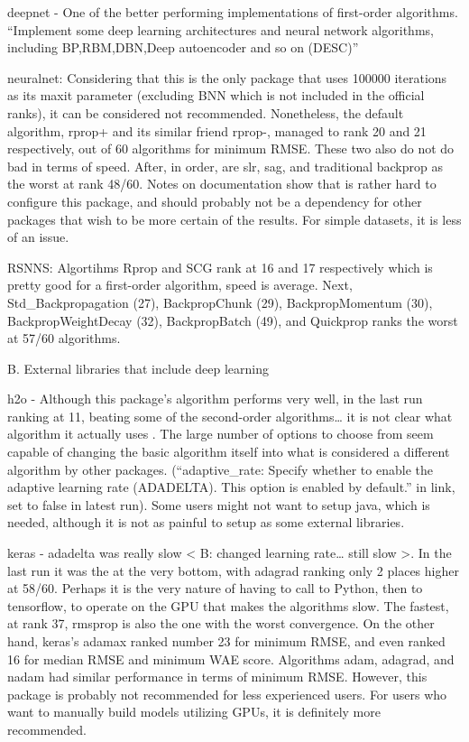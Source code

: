 deepnet - One of the better performing implementations of first-order
algorithms. ``Implement some deep learning architectures and neural
network algorithms, including BP,RBM,DBN,Deep autoencoder and so on
(DESC)''

neuralnet: Considering that this is the only package that uses 100000
iterations as its maxit parameter (excluding BNN which is not included
in the official ranks), it can be considered not recommended.
Nonetheless, the default algorithm, rprop+ and its similar friend
rprop-, managed to rank 20 and 21 respectively, out of 60 algorithms for
minimum RMSE. These two also do not do bad in terms of speed. After, in
order, are slr, sag, and traditional backprop as the worst at rank
48/60. Notes on documentation show that is rather hard to configure this
package, and should probably not be a dependency for other packages that
wish to be more certain of the results. For simple datasets, it is less
of an issue.

RSNNS: Algortihms Rprop and SCG rank at 16 and 17 respectively which is
pretty good for a first-order algorithm, speed is average. Next,
Std\_Backpropagation (27), BackpropChunk (29), BackpropMomentum (30),
BackpropWeightDecay (32), BackpropBatch (49), and Quickprop ranks the
worst at 57/60 algorithms.

B. External libraries that include deep learning

h2o - Although this package's algorithm performs very well, in the last
run ranking at 11, beating some of the second-order algorithms\ldots{}
it is not clear what algorithm it actually uses . The large number of
options to choose from seem capable of changing the basic algorithm
itself into what is considered a different algorithm by other packages.
(``adaptive\_rate: Specify whether to enable the adaptive learning rate
(ADADELTA). This option is enabled by default.'' in link, set to false
in latest run). Some users might not want to setup java, which is
needed, although it is not as painful to setup as some external
libraries.

keras - adadelta was really slow \textless{} B: changed learning
rate\ldots{} still slow \textgreater. In the last run it was the at the
very bottom, with adagrad ranking only 2 places higher at 58/60. Perhaps
it is the very nature of having to call to Python, then to tensorflow,
to operate on the GPU that makes the algorithms slow. The fastest, at
rank 37, rmsprop is also the one with the worst convergence. On the
other hand, keras's adamax ranked number 23 for minimum RMSE, and even
ranked 16 for median RMSE and minimum WAE score. Algorithms adam,
adagrad, and nadam had similar performance in terms of minimum RMSE.
However, this package is probably not recommended for less experienced
users. For users who want to manually build models utilizing GPUs, it is
definitely more recommended.

